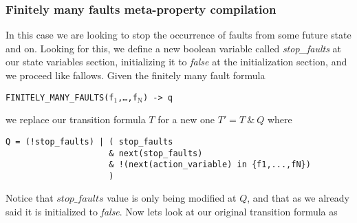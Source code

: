 \documentclass[12pt]{llncs2e/llncs}
\newcommand{\textusc}[1]{$_{\text{#1}}$} %
\begin{document}
\subsubsection*{Finitely many faults meta-property compilation}
In this case we are looking to stop the occurrence of faults from some future state and on. Looking for this, we define a new boolean variable called \textit{stop\_faults} at our state variables section, initializing it to \textit{false} at the initialization section, and we proceed like fallows. Given the finitely many fault formula
\begin{center}
\texttt{FINITELY\_MANY\_FAULTS(f\textusc{1},\ldots,f\textusc{N}) -> q}
\end{center}
we replace our transition formula $T$ for a new one $T' = T ~\&~ Q$ where
\begin{verbatim}
Q = (!stop_faults) | ( stop_faults
                     & next(stop_faults)
                     & !(next(action_variable) in {f1,...,fN})
                     )
\end{verbatim}
Notice that $stop\_faults$ value is only being modified at $Q$, and that as we already said it is initialized to \textit{false}. Now lets look at our original transition formula as 
\end{document}
